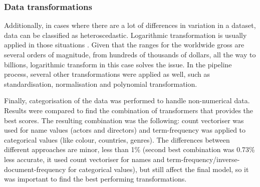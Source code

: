 \subsubsection{Data transformations}
Additionally, in cases where there are a lot of differences in variation in a dataset, data can be classified as heteroscedastic. Logarithmic transformation is usually applied in those situations \cite{kvalheim1994preprocessing}. Given that the ranges for the worldwide gross are several orders of magnitude, from hundreds of thousands of dollars, all the way to billions, logarithmic transform in this case solves the issue. In the pipeline process, several other transformations were applied as well, such as standardisation, normalisation and polynomial transformation. 

Finally, categorisation of the data was performed to handle non-numerical data. Results were compared to find the combination of transformers that provides the best scores. The resulting combination was the following: count vectoriser was used for name values (actors and directors) and term-frequency was applied to categorical values (like colour, countries, genres). The differences between different approaches are minor, less than 1\% (second best combination was 0.73\% less accurate, it used count vectoriser for names and term-frequency/inverse-document-frequency for categorical values), but still affect the final model, so it was important to find the best performing transformations.



